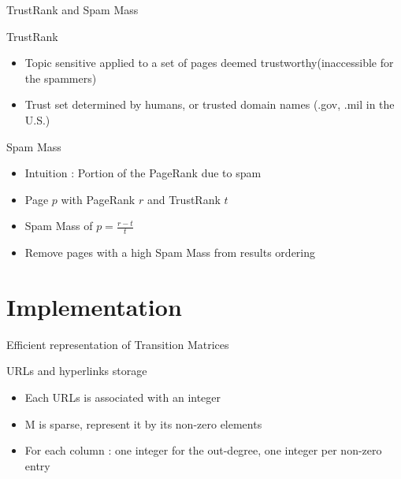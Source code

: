 \documentclass[10pt]{beamer}
\begin{document}
\begin{frame}{TrustRank and Spam Mass}
\begin{block}{TrustRank}
\begin{itemize}
\item Topic sensitive applied to a set of pages deemed trustworthy(inaccessible for the spammers)
\item Trust set determined by humans, or trusted domain names (.gov, .mil in the U.S.)
\end{itemize}
\end{block}
\begin{block}{Spam Mass}
\begin{itemize}
\item Intuition : Portion of the PageRank due to spam
\item Page $p$ with PageRank $r$ and TrustRank $t$
\item Spam Mass of $p = \frac{r-t}{t}$
\item Remove pages with a high Spam Mass from results ordering
\end{itemize}
\end{block}
\end{frame}

\section{Implementation}
\begin{frame}{Efficient representation of Transition Matrices}
  \begin{block}{URLs and hyperlinks storage}
  \begin{itemize}
    \item Each URLs is associated with an integer
    \item M is sparse, represent it by its non-zero elements
    \item For each column : one integer for the out-degree, one integer per non-zero entry
  \end{itemize}
  \end{block}
\end{frame}
\end{document}
